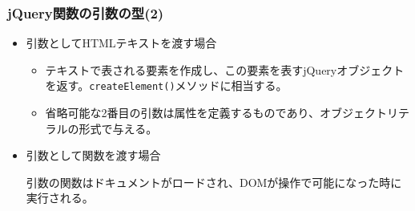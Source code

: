 \documentclass[dvipsk]{beamer}
\begin{document}
\begin{frame}[containsverbatim]
\frametitle{jQuery関数の引数の型(2)}
\begin{itemize}
 \item 引数としてHTMLテキストを渡す場合

\begin{itemize}
 \item テキストで表される要素を作成し、この要素を表すjQueryオブジェクト
       を返す。\texttt{createElement()}メソッドに相当する。
 \item 省略可能な2番目の引数は属性を定義するものであり、オブジェクトリテ
       ラルの形式で与える。
\end{itemize}       

 \item 引数として関数を渡す場合

       引数の関数はドキュメントがロードされ、DOMが操作で可能になった時に実行される。
\end{itemize}
\end{frame}
\end{document}
